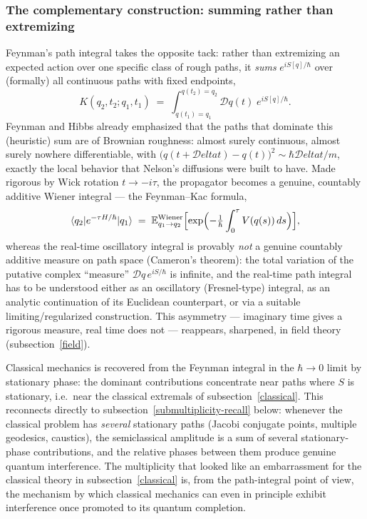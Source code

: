 \subsubsection{The complementary construction: summing rather than extremizing}

Feynman's path integral takes the opposite tack: rather than extremizing an
expected action over one specific class of rough paths, it \emph{sums}
$e^{iS[q]/\hbar}$ over (formally) all continuous paths with fixed endpoints,
\[
K(q_2,t_2;q_1,t_1) \;=\; \int_{q(t_1)=q_1}^{q(t_2)=q_2} 
\mathcal{D} q(t)\; e^{iS[q]/\hbar}.
\]
Feynman and Hibbs already emphasized that the paths that dominate this
(heuristic) sum are of Brownian roughness: almost surely continuous, almost
surely nowhere differentiable, with $\bigl(q(t+\mathcal{D}elta t)-q(t)\bigr)^2
\sim \hbar\mathcal{D}elta t/m$, exactly the local behavior that Nelson's
diffusions were built to have. Made rigorous by Wick rotation $t\to -i\tau$,
the propagator becomes a genuine, countably additive Wiener integral --- the
Feynman--Kac formula,
\[
\langle q_2 | e^{-\tau H/\hbar} | q_1\rangle \;=\; 
\mathbb{E}^{\text{Wiener}}_{q_1\to q_2}\Bigl[\exp\Bigl(-\tfrac1\hbar
\int_0^\tau V(q(s))\,ds\Bigr)\Bigr],
\]
whereas the real-time oscillatory integral is provably \emph{not} a genuine
countably additive measure on path space (Cameron's theorem): the total
variation of the putative complex ``measure'' $\mathcal{D} q\, e^{iS/\hbar}$ is
infinite, and the real-time path integral has to be understood either as an
oscillatory (Fresnel-type) integral, as an analytic continuation of its
Euclidean counterpart, or via a suitable limiting/regularized construction.
This asymmetry --- imaginary time gives a rigorous measure, real time does not
--- reappears, sharpened, in field theory (subsection~\ref{field}).

Classical mechanics is recovered from the Feynman integral in the $\hbar\to0$
limit by stationary phase: the dominant contributions concentrate near paths
where $S$ is stationary, i.e.\ near the classical extremals of
subsection~\ref{classical}. This reconnects directly to
subsection~\ref{submultiplicity-recall} below: whenever the classical problem
has \emph{several} stationary paths (Jacobi conjugate points, multiple
geodesics, caustics), the semiclassical amplitude is a sum of several
stationary-phase contributions, and the relative phases between them produce
genuine quantum interference. The multiplicity that looked like an
embarrassment for the classical theory in subsection~\ref{classical} is, from
the path-integral point of view, the mechanism by which classical mechanics can
even in principle exhibit interference once promoted to its quantum completion.

